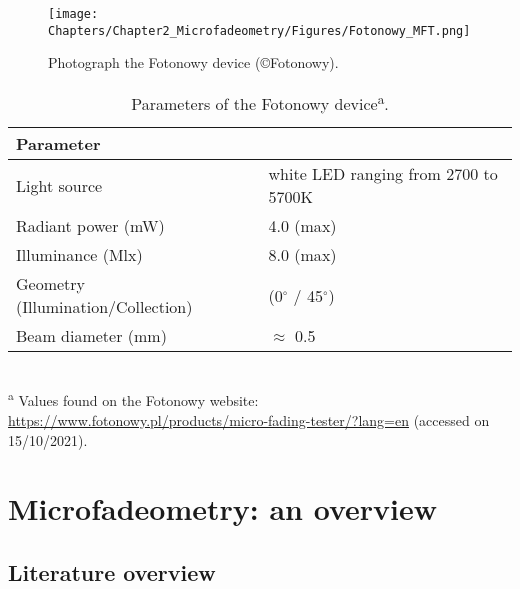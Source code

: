 \begin{figure}[!h]
\centering
\texttt{[image: Chapters/Chapter2\_Microfadeometry/Figures/Fotonowy\_MFT.png]}
\caption[\hspace{0.3cm}The Fotonowy device]{Photograph the Fotonowy device (\copyright Fotonowy).}
\label{fig:MFT_fotonowy}
\end{figure}

\vspace{0.3cm}

\begin{table*}[!h]
\centering %
\caption[\hspace{0.3cm}Parameters of the Fotonowy device]{Parameters of the Fotonowy device\textsuperscript{a}.}
\begin{tabular}{R{5.5cm}L{7cm}}
\toprule[0.4mm]
\textbf{Parameter} &  \\\midrule
Light source  & white \gls{LED} ranging from 2700 to 5700\unit{\kelvin}  \\
Radiant power (\unit{\milli\watt}) & 4.0 (max) \\
Illuminance (\unit{\mega\lux}) & 8.0 (max) \\
Geometry (Illumination/Collection) & (0$^\circ$ / 45$^\circ$) \\
Beam diameter (\unit{\mm}) & $\approx$ 0.5\\
\bottomrule[0.4mm]
\end{tabular}
\footnotesize{\\ \textsuperscript{a} Values found on the Fotonowy website: \url{https://www.fotonowy.pl/products/micro-fading-tester/?lang=en} (accessed on 15/10/2021).}
\label{tab:MFT_fotonowy}
\end{table*}


\newpage
\section{Microfadeometry: an overview}

\subsection{Literature overview}

